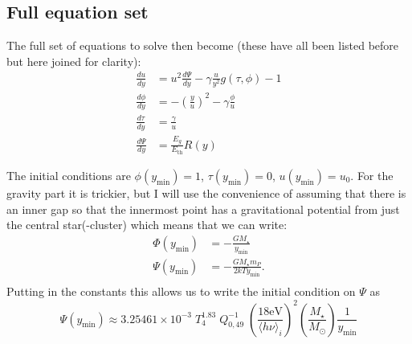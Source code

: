 \documentclass[11pt]{article}
\newcommand{\ddy}[1]{\frac{d#1}{dy}}
\newcommand{\hnui}{\ensuremath{\langle h\nu\rangle_i}}
\newcommand{\transPhi}{\Psi}
\newcommand{\ymin}{\ensuremath{y_{\mathrm{min}}}}
\begin{document}
\subsection{Full equation set}
\label{sec:full-equation-set}

The full set of equations to solve then become (these have all been listed before but here joined for clarity):
\begin{align}
  \label{eq:21}
  \ddy{u} & = u^2 \ddy{\transPhi} - \gamma\frac{u}{y^2}g(\tau,\phi) - 1 \\
  \ddy{\phi} & = -\left(\frac{y}{u}\right)^2-\gamma \frac{\phi}{u}\\
  \ddy{\tau} & = \frac{\gamma}{u} \\
  \ddy{\transPhi} & = \frac{E_g}{E_{\mathrm{th}}} R(y)
 \end{align}

The initial conditions are $\phi(\ymin)=1$, $\tau(\ymin)=0$, $u(\ymin)=u_0$. For the gravity part it is trickier, but I will use the convenience of assuming that there is an inner gap so that the innermost point has a gravitational potential from just the central star(-cluster) which means that we can write:
\begin{align}
  \label{eq:22}
  \Phi(\ymin) & = -\frac{GM_\star}{\ymin} \\
  \transPhi(\ymin) & = -\frac{GM_\star m_P}{2 kT \ymin}. \\
\end{align}
Putting in the constants this allows us to write the initial condition on $\transPhi$ as
\begin{equation}
  \label{eq:24}
  \transPhi(\ymin) \approx 3.25461\times 10^{-3}\; T_4^{1.83}\; Q_{0,49}^{-1}\; \left(\frac{18\mathrm{eV}}{\hnui}\right)^2 \left(\frac{M_\star}{M_\odot}\right) \frac{1}{\ymin}
\end{equation}
\end{document}
